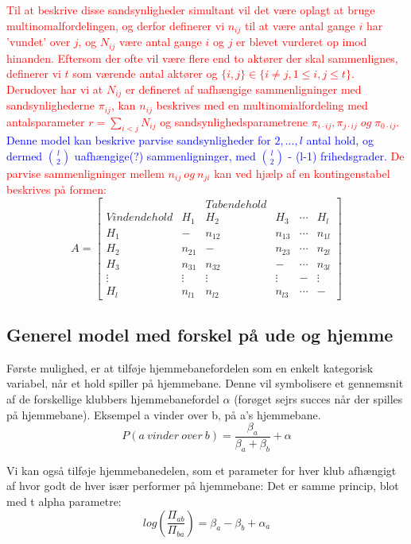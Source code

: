 \documentclass[11pt,a4paper]{article}
\begin{document}
\textcolor{red}{
Til at beskrive disse sandsynligheder simultant vil det være oplagt at bruge multinomalfordelingen, og derfor definerer vi $n_{ij}$ til at være antal gange $i$ har 'vundet' over $j$, og $N_{ij}$ være antal gange $i$ og $j$ er blevet vurderet op imod hinanden. Eftersom der ofte vil være flere end to aktører der skal sammenlignes, definerer vi $t$ som værende antal aktører og $\{i,j\} \in \{i \neq j, 1 \leq i, j \leq t\}$. Derudover har vi at $N_{ij}$ er defineret af uafhængige sammenligninger med sandsynlighederne $\pi_{ij}$, kan $n_{ij}$ beskrives med en multinomialfordeling med antalsparameter $r = \sum_{i < j} N_{ij}$ og sandsynlighedsparametrene $\pi_{i\cdot ij},\pi_{j\cdot ij} \; og \; \pi_{0\cdot ij}$. \textcolor{blue}{Denne model kan beskrive parvise sandsynligheder for $2,...,l$ antal hold, og dermed $\binom{l}{2}$ uafhængige(?) sammenligninger, med $\binom{l}{2}$ - (l-1) frihedsgrader.} De parvise sammenligninger mellem $n_{ij} \ og \ n_{ji}$ kan ved hjælp af en kontingenstabel beskrives på formen:
}
$$
A = 
\begin{bmatrix}
&& Tabendehold &&
\\   
Vindendehold & H_1 & H_2 & H_3 & \cdots & H_l
\\ H_1 & - & n_{12} & n_{13} & \cdots & n_{1l} 
\\ H_2 & n_{21} & - & n_{23} & \cdots & n_{2l}
\\ H_3 & n_{31} & n_{32} & - & \cdots & n_{3l}
\\ \vdots & \vdots & \vdots & \vdots & - & \vdots
\\ H_l & n_{l1} &  n_{l2} & n_{l3} & \cdots & -
\end{bmatrix} 
$$

\subsection{Generel model med forskel på ude og hjemme}
Første mulighed, er at tilføje hjemmebanefordelen som en enkelt kategorisk variabel, når et hold spiller på hjemmebane. Denne vil symbolisere et gennemsnit af de forskellige klubbers hjemmebanefordel $\alpha$ (forøget sejrs succes når der spilles på hjemmebane). 
Eksempel a vinder over b, på a's hjemmebane. 
\begin{equation}
P(a\ vinder\ over\ b) = \frac{\beta_a}{\beta_a+\beta_b}+\alpha
\end{equation}

Vi kan også tilføje hjemmebanedelen, som et parameter for hver klub afhængigt af hvor godt de hver især performer på hjemmebane:
Det er samme princip, blot med t alpha parametre:
\begin{equation}
log(\frac{\Pi_{ab}}{\Pi_{ba}}) = \beta_a-\beta_b + \alpha_a
\end{equation}
\end{document}
